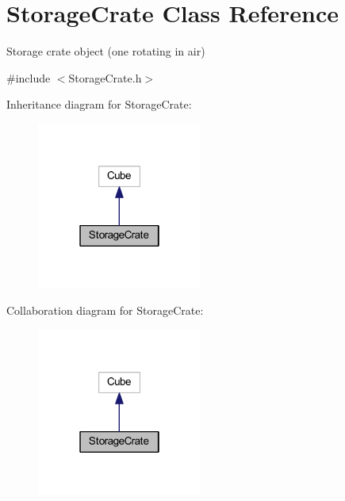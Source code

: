 \hypertarget{class_storage_crate}{}\section{Storage\+Crate Class Reference}
\label{class_storage_crate}


Storage crate object (one rotating in air)  




{\ttfamily \#include $<$Storage\+Crate.\+h$>$}



Inheritance diagram for Storage\+Crate\+:
\nopagebreak
\begin{figure}[H]
\begin{center}
\leavevmode
\includegraphics[width=154pt]{class_storage_crate__inherit__graph}
\end{center}
\end{figure}


Collaboration diagram for Storage\+Crate\+:
\nopagebreak
\begin{figure}[H]
\begin{center}
\leavevmode
\includegraphics[width=154pt]{class_storage_crate__coll__graph}
\end{center}
\end{figure}
